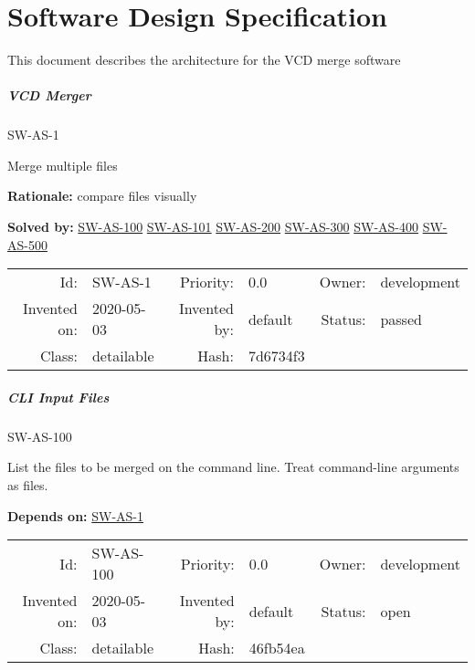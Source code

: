 

\chapter{Software Design Specification }

This document describes the architecture for the VCD merge software

\paragraph{VCD Merger}

\hypertarget{SW-AS-1}{SW-AS-1} 
\label{SW-AS-1}

Merge multiple files


\textbf{Rationale:} compare files visually




 \textbf{Solved by:}
 \hyperlink{SW-AS-100}{SW-AS-100}  \hyperlink{SW-AS-101}{SW-AS-101}  \hyperlink{SW-AS-200}{SW-AS-200}  \hyperlink{SW-AS-300}{SW-AS-300}  \hyperlink{SW-AS-400}{SW-AS-400}  \hyperlink{SW-AS-500}{SW-AS-500} 






\par{\small \begin{center}
\begin{tabular}{rlrlrl}
   Id: & SW-AS-1               & Priority: & 0.0          & Owner: & development \\
   Invented on: & 2020-05-03 & Invented by: & default & Status: & passed \\
   Class: & detailable & Hash: & 7d6734f3
\end{tabular}\end{center}
}

\paragraph{CLI Input Files}

\hypertarget{SW-AS-100}{SW-AS-100} 
\label{SW-AS-100}

List the files to be merged on the command line. Treat command-line arguments as files.







 \textbf{Depends on:}
 \hyperlink{SW-AS-1}{SW-AS-1} 




\par{\small \begin{center}
\begin{tabular}{rlrlrl}
   Id: & SW-AS-100               & Priority: & 0.0          & Owner: & development \\
   Invented on: & 2020-05-03 & Invented by: & default & Status: & open \\
   Class: & detailable & Hash: & 46fb54ea
\end{tabular}\end{center}
}

